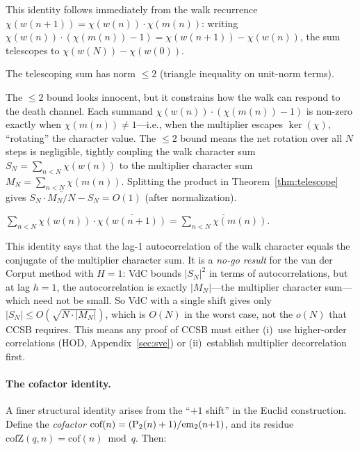 This identity follows immediately from the walk recurrence
$\chi(w(n{+}1)) = \chi(w(n)) \cdot \chi(m(n))$: writing
$\chi(w(n)) \cdot (\chi(m(n)) - 1) = \chi(w(n{+}1)) - \chi(w(n))$,
the sum telescopes to $\chi(w(N)) - \chi(w(0))$.

\begin{theorem}
The telescoping sum has norm $\leq 2$ (triangle inequality on
unit-norm terms).
\end{theorem}

The $\leq 2$ bound looks innocent, but it constrains how the walk
can respond to the death channel.  Each summand
$\chi(w(n))\cdot(\chi(m(n)) - 1)$ is non-zero exactly when
$\chi(m(n)) \neq 1$---i.e., when the multiplier escapes
$\ker(\chi)$, ``rotating'' the character value.  The $\leq 2$ bound
means the net rotation over all $N$ steps is negligible, tightly
coupling the walk character sum $S_N = \sum_{n<N} \chi(w(n))$ to the
multiplier character sum $M_N = \sum_{n<N} \chi(m(n))$.  Splitting
the product in Theorem~\ref{thm:telescope} gives
$S_N \cdot \overline{M_N/N} - S_N = O(1)$ (after normalization).

\begin{theorem}
\label{thm:shift-one}
$\sum_{n < N} \chi(w(n)) \cdot \overline{\chi(w(n+1))}
  = \overline{\sum_{n < N} \chi(m(n))}$.
\end{theorem}

This identity says that the lag-1 autocorrelation of the walk
character equals the conjugate of the multiplier character sum.  It is
a \emph{no-go result} for the van der Corput method with $H = 1$:
VdC bounds $|S_N|^2$ in terms of autocorrelations, but at lag $h = 1$,
the autocorrelation is exactly $|M_N|$---the multiplier character
sum---which need not be small.  So VdC with a single shift gives only
$|S_N| \leq O(\sqrt{N \cdot |M_N|})$, which is $O(N)$ in the worst
case, not the $o(N)$ that CCSB requires.  This means any proof of CCSB
must either (i)~use higher-order correlations (HOD,
Appendix~\ref{sec:sve}) or (ii)~establish multiplier decorrelation
first.

\paragraph{The cofactor identity.}
A finer structural identity arises from the ``$+1$ shift'' in the
Euclid construction.  Define the \emph{cofactor}
$\text{cof}(n) = (\mathrm{P}_{2}(n)+1)/\mathrm{em}_{2}(n{+}1)$, and its residue
$\mathrm{cofZ}(q, n) = \text{cof}(n) \bmod q$.  Then:

